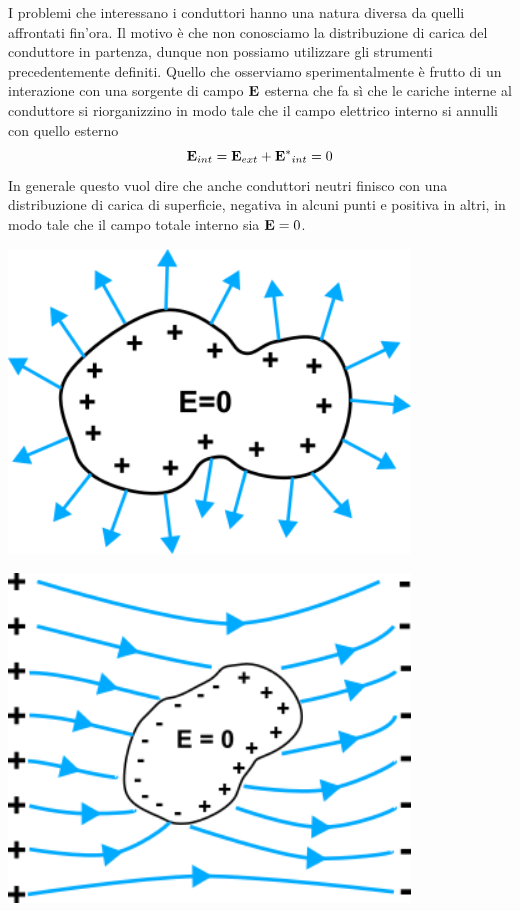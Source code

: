 I problemi che interessano i conduttori hanno una natura diversa da quelli affrontati fin'ora. Il motivo \`e che non conosciamo la distribuzione di carica del conduttore in partenza, dunque non possiamo utilizzare gli strumenti precedentemente definiti. Quello che osserviamo sperimentalmente \`e frutto di un interazione con una sorgente di campo $\bold{E}$ esterna che fa s\`i che le cariche interne al conduttore si riorganizzino in modo tale che il campo elettrico interno si annulli con quello esterno 
\begin{equation*}
	\bold{E}_{int} = \bold{E}_{ext} + \bold{E^*}_{int} = 0
\end{equation*}
In generale questo vuol dire che anche conduttori neutri finisco con una distribuzione di carica di superficie, negativa in alcuni punti e positiva in altri, in modo tale che il campo totale interno sia $\bold{E} = 0$.
\newpage
\begin{minipage}{0.5\textwidth}
    \centering
    \includegraphics[width=0.8\textwidth]{images/isolanti.png}
\end{minipage}%
\begin{minipage}{0.5\textwidth}
    \centering
    \includegraphics[width=0.8\textwidth]{images/conduct}
\end{minipage}
\\

